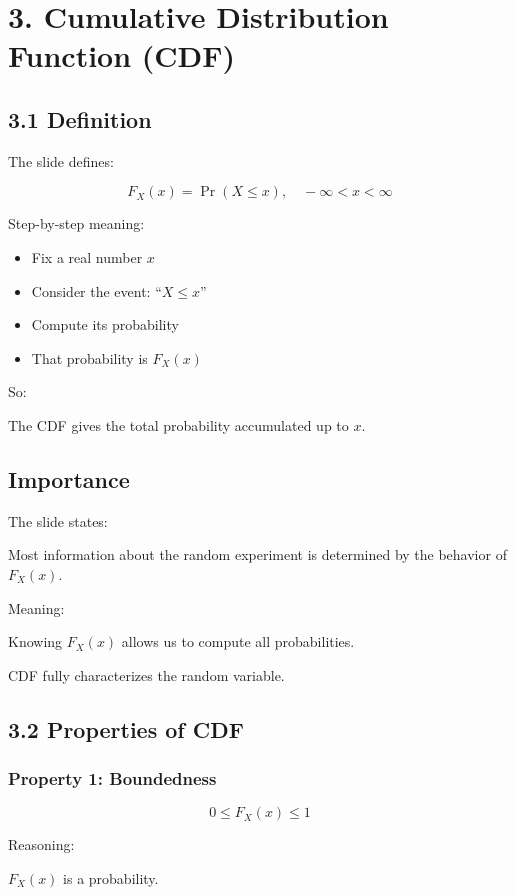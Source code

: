 \documentclass[12pt]{article}
\begin{document}
\section*{3. Cumulative Distribution Function (CDF)}

\subsection*{3.1 Definition}

The slide defines:

\[
F_X(x) = \Pr(X \le x), \quad -\infty < x < \infty
\]

Step-by-step meaning:

\begin{itemize}
\item Fix a real number $x$
\item Consider the event: ``$X \le x$''
\item Compute its probability
\item That probability is $F_X(x)$
\end{itemize}

So:

The CDF gives the total probability accumulated up to $x$.

\subsection*{Importance}

The slide states:

Most information about the random experiment is determined by the behavior of $F_X(x)$.

Meaning:

Knowing $F_X(x)$ allows us to compute all probabilities.

CDF fully characterizes the random variable.

\subsection*{3.2 Properties of CDF}

\subsubsection*{Property 1: Boundedness}

\[
0 \le F_X(x) \le 1
\]

Reasoning:

$F_X(x)$ is a probability.
\end{document}

